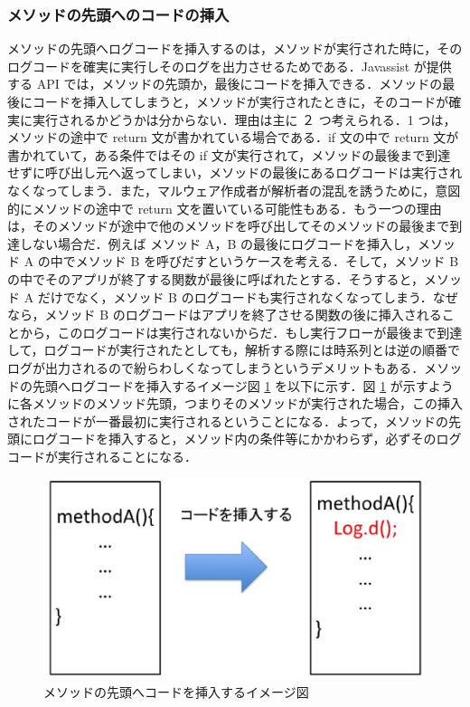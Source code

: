 \subsubsection{メソッドの先頭へのコードの挿入}
 \label{methodtop}
メソッドの先頭へログコードを挿入するのは，メソッドが実行された時に，そのログコードを確実に実行しそのログを出力させるためである．Javassist が提供する API では，メソッドの先頭か，最後にコードを挿入できる．メソッドの最後にコードを挿入してしまうと，メソッドが実行されたときに，そのコードが確実に実行されるかどうかは分からない．理由は主に ２ つ考えられる．1 つは，メソッドの途中で return 文が書かれている場合である．if 文の中で return 文が書かれていて，ある条件ではその if 文が実行されて，メソッドの最後まで到達せずに呼び出し元へ返ってしまい，メソッドの最後にあるログコードは実行されなくなってしまう．また，マルウェア作成者が解析者の混乱を誘うために，意図的にメソッドの途中で return 文を置いている可能性もある．もう一つの理由は，そのメソッドが途中で他のメソッドを呼び出してそのメソッドの最後まで到達しない場合だ．例えば メソッド A，B の最後にログコードを挿入し，メソッド A の中でメソッド B を呼びだすというケースを考える．そして，メソッド B の中でそのアプリが終了する関数が最後に呼ばれたとする．そうすると，メソッド A だけでなく，メソッド B のログコードも実行されなくなってしまう．なぜなら，メソッド B のログコードはアプリを終了させる関数の後に挿入されることから，このログコードは実行されないからだ．もし実行フローが最後まで到達して，ログコードが実行されたとしても，解析する際には時系列とは逆の順番でログが出力されるので紛らわしくなってしまうというデメリットもある．メソッドの先頭へログコードを挿入するイメージ図 \ref{insertbefore} を以下に示す．図 \ref{insertbefore} が示すように各メソッドのメソッド先頭，つまりそのメソッドが実行された場合，この挿入されたコードが一番最初に実行されるということになる．よって，メソッドの先頭にログコードを挿入すると，メソッド内の条件等にかかわらず，必ずそのログコードが実行されることになる．

\begin{figure}[t]
\begin{center}
\includegraphics[scale=0.3]{image2.eps}
\end{center}
\caption{メソッドの先頭へコードを挿入するイメージ図}
\label{insertbefore}
\end{figure}

